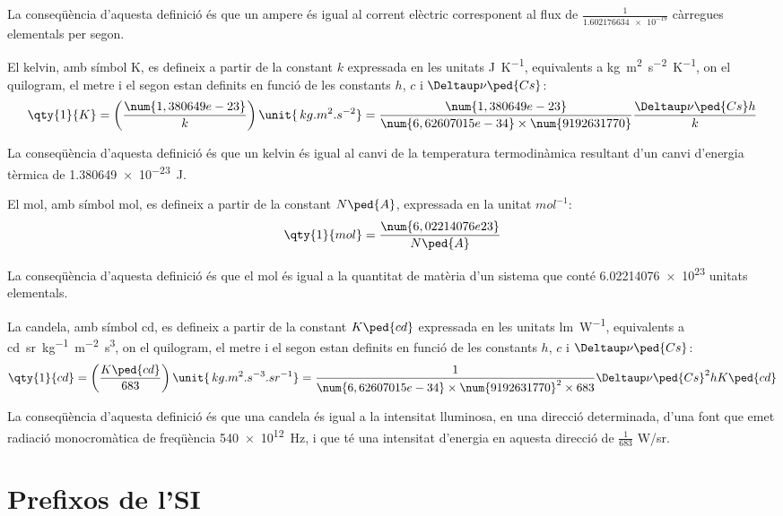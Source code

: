 \begin{list}{}
    La conseqüència d'aquesta definició és que un ampere és igual al corrent elèctric corresponent al flux de $\frac{1}{\num{1,602176634e-19}}$   càrregues elementals per segon.

   \item[\textbf{kelvin}]  El kelvin, amb símbol K, es defineix a partir de la constant $k$ expressada en les unitats \unit{J.K^{-1}},  equivalents a \unit{kg.m^2.s^{-2}.K^{-1}},  on el quilogram, el metre i el segon estan definits en funció de les constants $h$, $c$ i $\Deltaup\nu\ped{Cs}$:
       \[
            \qty{1}{K} = \left(\frac{\num{1,380649e-23}}{k}\right)\unit{\,kg.m^2.s^{-2}} = \frac{\num{1,380649e-23}}{\num{6,62607015 e-34}\times\num{9192631770}} \frac{\Deltaup\nu\ped{Cs} h}{k}
       \]

    La conseqüència d'aquesta definició és que un kelvin és igual al canvi de la temperatura termodinàmica resultant d'un canvi d'energia tèrmica de \qty{1,380649e-23}{J}.

   \item[\textbf{mol}]  El mol, amb símbol mol, es defineix a partir de la constant $N\ped{A}$, expressada en la unitat  $\unit{mol^{-1}}$:
       \[
            \qty{1}{mol} = \frac{\num{6,02214076 e23}}{N\ped{A}}
       \]

    La conseqüència d'aquesta definició és que el mol és igual a la quantitat de matèria d'un sistema que conté
    \num{6,02214076 e23} unitats elementals.

   \item[\textbf{candela}] La candela, amb símbol cd, es defineix a partir de la constant $K\ped{cd}$ expressada en les unitats \unit{lm.W^{-1}},  equivalents a \unit{cd.sr.kg^{-1}.m^{-2}.s^3},  on el quilogram, el metre i el segon estan definits en funció de les constants $h$, $c$ i $\Deltaup\nu\ped{Cs}$:
       \[
            \qty{1}{cd} = \left(\frac{K\ped{cd}}{683}\right)\unit{\,kg.m^2.s^{-3}.sr^{-1}} = \frac{1}{\num{6,62607015 e-34}\times\num{9192631770}^2\times 683} \Deltaup\nu\ped{Cs}^2 h K\ped{cd}
       \]

    La conseqüència d'aquesta definició és que una candela és igual a la intensitat lluminosa, en una direcció determinada,   d'una font que emet radiació monocromàtica de freqüència \qty{540e12}{Hz}, i
   que té una intensitat d'energia en aquesta direcció de $\frac{1}{683}$ \unit{W/sr}.
\end{list}


\section{Prefixos de l'SI}

